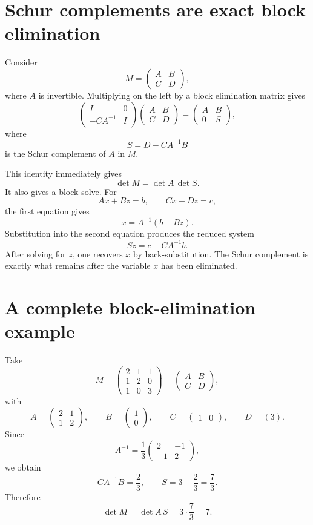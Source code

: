 \section{Schur complements are exact block elimination}

Consider
\[
  M=
  \begin{pmatrix}
    A&B\\
    C&D
  \end{pmatrix},
\]
where \(A\) is invertible.  Multiplying on the left by a block elimination matrix gives
\[
  \begin{pmatrix}
    I&0\\
    -CA^{-1}&I
  \end{pmatrix}
  \begin{pmatrix}
    A&B\\
    C&D
  \end{pmatrix}
  =
  \begin{pmatrix}
    A&B\\
    0&S
  \end{pmatrix},
\]
where
\[
  \boxed{S=D-CA^{-1}B}
\]
is the Schur complement of \(A\) in \(M\).

This identity immediately gives
\[
  \det M=\det A\,\det S.
\]
It also gives a block solve.  For
\[
  Ax+Bz=b,
  \qquad
  Cx+Dz=c,
\]
the first equation gives
\[
  x=A^{-1}(b-Bz).
\]
Substitution into the second equation produces the reduced system
\[
  Sz=c-CA^{-1}b.
\]
After solving for \(z\), one recovers \(x\) by back-substitution.  The Schur complement is exactly what remains after the variable \(x\) has been eliminated.

\section{A complete block-elimination example}

Take
\[
  M=
  \begin{pmatrix}
    2&1&1\\
    1&2&0\\
    1&0&3
  \end{pmatrix}
  =
  \begin{pmatrix}
    A&B\\C&D
  \end{pmatrix},
\]
with
\[
  A=\begin{pmatrix}2&1\\1&2\end{pmatrix},
  \qquad
  B=\begin{pmatrix}1\\0\end{pmatrix},
  \qquad
  C=\begin{pmatrix}1&0\end{pmatrix},
  \qquad
  D=(3).
\]
Since
\[
  A^{-1}=\frac13
  \begin{pmatrix}2&-1\\-1&2\end{pmatrix},
\]
we obtain
\[
  CA^{-1}B=\frac23,
  \qquad
  S=3-\frac23=\frac73.
\]
Therefore
\[
  \det M=\det A\,S=3\cdot\frac73=7.
\]

